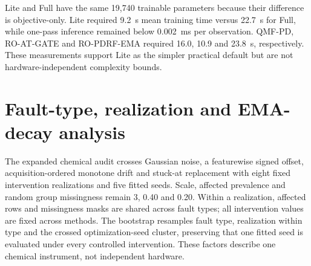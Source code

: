 \documentclass[10pt]{article}
\begin{document}
Lite and Full have the same 19,740 trainable parameters because their difference is objective-only. Lite required 9.2~s mean training time versus 22.7~s for Full, while one-pass inference remained below 0.002~ms per observation. QMF-PD, RO-AT-GATE and RO-PDRF-EMA required 16.0, 10.9 and 23.8~s, respectively. These measurements support Lite as the simpler practical default but are not hardware-independent complexity bounds.

\section{Fault-type, realization and EMA-decay analysis}

The expanded chemical audit crosses Gaussian noise, a featurewise signed offset, acquisition-ordered monotone drift and stuck-at replacement with eight fixed intervention realizations and five fitted seeds. Scale, affected prevalence and random group missingness remain 3, 0.40 and 0.20. Within a realization, affected rows and missingness masks are shared across fault types; all intervention values are fixed across methods. The bootstrap resamples fault type, realization within type and the crossed optimization-seed cluster, preserving that one fitted seed is evaluated under every controlled intervention. These factors describe one chemical instrument, not independent hardware.

\begin{table}[H]
\centering
\caption{Affected-subset discrimination and probability quality across four controlled fault mechanisms, eight realizations and five fitted seeds. Intervals for the EMA99 AUROC contrast use 5,000 crossed-factor bootstrap replicates.}
\label{tab:supp-fault-type-ema}
\resizebox{\textwidth}{!}{}
\end{table}

\begin{table}[H]
\centering
\caption{Per-fault architecture effects. Intervals resample fault realization and the crossed optimization-seed cluster within each controlled mechanism. The four-type aggregate resamples only four top-level clusters and is therefore descriptive.}
\label{tab:supp-fault-architecture}
\resizebox{0.92\textwidth}{!}{}
\end{table}

\begin{table}[H]
\centering
\caption{Leave-one-fault-type-out sensitivity for the RO-PDRF-Full--RO-CAGF affected-AUROC difference. Each row has only three remaining top-level fault clusters; intervals are descriptive robustness summaries, not device-generalization intervals.}
\label{tab:supp-lofo}
\resizebox{0.84\textwidth}{!}{}
\end{table}
\end{document}
